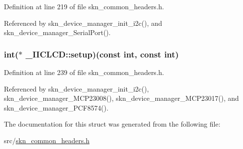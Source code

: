 Definition at line 219 of file skn\+\_\+common\+\_\+headers.\+h.



Referenced by skn\+\_\+device\+\_\+manager\+\_\+init\+\_\+i2c(), and skn\+\_\+device\+\_\+manager\+\_\+\+Serial\+Port().

\hypertarget{struct___i_i_c_l_c_d_a6bc8b9b3e5e69bfa25fdcd6b3c27628e}{
\subsubsection[{setup}]{\setlength{\rightskip}{0pt plus 5cm}int($\ast$ \+\_\+\+I\+I\+C\+L\+C\+D\+::setup)(const int, const int)}}\label{struct___i_i_c_l_c_d_a6bc8b9b3e5e69bfa25fdcd6b3c27628e}


Definition at line 239 of file skn\+\_\+common\+\_\+headers.\+h.



Referenced by skn\+\_\+device\+\_\+manager\+\_\+init\+\_\+i2c(), skn\+\_\+device\+\_\+manager\+\_\+\+M\+C\+P23008(), skn\+\_\+device\+\_\+manager\+\_\+\+M\+C\+P23017(), and skn\+\_\+device\+\_\+manager\+\_\+\+P\+C\+F8574().



The documentation for this struct was generated from the following file\+:\begin{DoxyCompactItemize}
\item 
src/\hyperlink{skn__common__headers_8h}{skn\+\_\+common\+\_\+headers.\+h}\end{DoxyCompactItemize}
